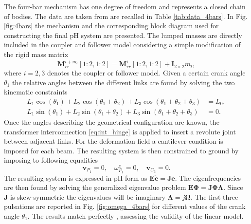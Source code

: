 \documentclass{svjour3}                     %
\begin{document}
The four-bar mechanism has one degree of freedom and represents a closed chain of bodies. The data are taken from \cite{KITIS1990267,Chebbi2017} are recalled in Table \ref{tab:data_4bars}. In Fig. \ref{fig:4bars} the mechanism and the corresponding block diagram used for constructing the final pH system are presented. The lumped masses are directly included in the coupler and follower model considering a simple modification of the rigid mass matrix
\begin{equation*}
\mathbf{M}_{rr}^{i + m_l}[1:2,1:2] = \mathbf{M}_{rr}^{i}[1:2,1:2] + \mathbf{I}_{2\times 2} m_l,
\end{equation*} 
where $i=2,3$ denotes the coupler or follower model. Given a certain crank angle $\theta_1$ the relative angles between the different links are found by solving the two kinematic constraints
\begin{align*}
L_1 \cos(\theta_1)+ L_2 \cos(\theta_1+\theta_2)+ L_3 \cos(\theta_1+\theta_2+\theta_3) &=L_0, \\
L_1 \sin(\theta_1)+L_2 \sin(\theta_1+\theta_2)+L_3 \sin(\theta_1+\theta_2+\theta_3) &=0.
\end{align*} 
Once the angles describing the geometrical configuration are known, the transformer interconnection \eqref{eq:int_hinge} is applied to insert a revolute joint between adjacent links. For the deformation field a cantilever condition is imposed for each beam. The resulting system is then constrained to ground by imposing to following equalities
\begin{equation*}
\mathbf{v}_{P_1} = 0, \quad \omega^z_{P_1} = 0, \quad \mathbf{v}_{C_3} = 0.
\end{equation*}
The resulting system is expressed in pH form as $\mathbf{E}\dot{\mathbf{e}} = \mathbf{J} \mathbf{e}$. The eigenfrequencies are then found by solving the generalized eigenvalue problem $\mathbf{E}\bm{\Phi} = \mathbf{J} \bm{\Phi \Lambda}$. Since $\mathbf{J}$ is skew-symmetric the eigenvalues will be imaginary $\bm{\Lambda} = j \bm{\Omega}$. The first three pulsations  are reported in Fig. \ref{fig:omega_4bars} for different values of the crank angle $\theta_1$. The results match perfectly \cite{KITIS1990267,Chebbi2017}, assessing the validity of the linear model.
\end{document}
